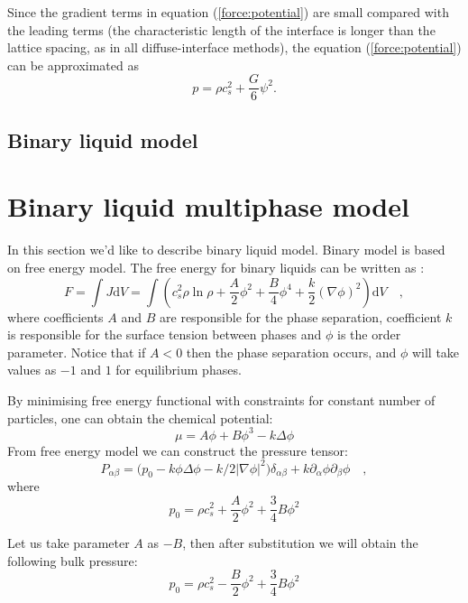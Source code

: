 \documentclass[mathpazo,sort,numbers]{cicp}
\begin{document}
Since the gradient terms in equation (\ref{force:potential}) are small compared with the leading terms (the characteristic length of the interface is longer than the lattice spacing, as in
all diffuse-interface methods), the equation (\ref{force:potential}) can be approximated as
\begin{equation}
p=\rho c_s^2+\frac{G}{6}\psi^2.
\end{equation}

\subsection{Binary liquid model}
\section{Binary liquid multiphase model}
In this section we'd like to describe binary liquid model. Binary model is based on free energy model. The free energy for binary liquids can be written as \cite{swift,landau}:
\begin{equation}
F=\int{J \mathrm{d}V}=\int{\left(c_s^2\rho\ln\rho+\frac{A}{2}\phi^2+\frac{B}{4}\phi^4 + \frac{k}{2}(\nabla \phi)^2 \right)\mathrm{d}V} \quad,
\end{equation}
where coefficients $A$ and $B$ are responsible for the phase separation, coefficient $k$ is responsible for the surface tension between phases and $\phi$ is the order parameter. Notice that if $A<0$ then the phase separation occurs, and $\phi$ will take values as $-1$ and $1$ for equilibrium phases.

By minimising free energy functional with constraints for constant number of particles, one can obtain the chemical potential:
\begin{equation}
\mu=A\phi+B\phi^3 - k \Delta \phi
\end{equation}
From free energy model we can construct the pressure tensor:
\begin{equation}
P_{\alpha \beta}=\bigg(p_0 - k\phi\Delta\phi-k/2 |\nabla \phi|^2\bigg)\delta_{\alpha\beta}+k\partial_{\alpha}\phi\partial_{\beta}\phi \quad,
\end{equation}
where
\begin{equation}
 p_0=\rho c_s^2+\frac{A}{2}\phi^2+\frac{3}{4}B \phi^2
\label{binary:bulk:pressure}
\end{equation}

Let us take parameter $A$ as $-B$, then after substitution we will obtain the following bulk pressure:
\begin{equation}
 p_0=\rho c_s^2-\frac{B}{2}\phi^2+\frac{3}{4}B \phi^2
\end{equation}
\end{document}
